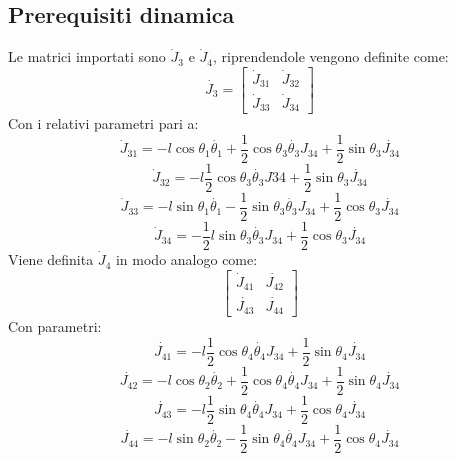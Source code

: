 \subsection{Prerequisiti dinamica}\label{appendice:t34punto}
Le matrici importati sono $\dot{J}_3$ e $\dot{J}_4$, riprendendole vengono definite come:
\begin{equation}
\dot{J_3} =
\begin{bmatrix}
 	\dot{J}_{31} & \dot{J}_{32} \\ 
 	\dot{J}_{33} & \dot{J}_{34}
 \end{bmatrix}
\end{equation}
Con i relativi parametri pari a:
\begin{equation*}
\dot{J}_{31} = -l\cos\theta_1\dot{\theta_1}+\frac{1}{2}\cos\theta_3\dot{\theta_3}J_{34}+\frac{1}{2}\sin\theta_3\dot{J_{34}}
\end{equation*}
\begin{equation*}
\dot{J}_{32} =   -l\frac{1}{2}\cos\theta_3\dot{\theta_3}J34+\frac{1}{2}\sin\theta_3\dot{J_{34}} 
\end{equation*}
\begin{equation*}
\dot{J}_{33} =  -l\sin\theta_1\dot{\theta_1}-\frac{1}{2}\sin\theta_3\dot{\theta_3}J_{34}+\frac{1}{2}\cos\theta_3\dot{J_{34}}
\end{equation*}
\begin{equation*}
\dot{J}_{34} = -\frac{1}{2}l\sin\theta_3\dot{\theta_3}J_{34}+\frac{1}{2}\cos\theta_3\dot{J_{34}}
\end{equation*}
Viene definita $\dot{J}_4$ in modo analogo come:
\begin{equation}
\begin{bmatrix}
\dot{J}_{41}  & \dot{J_{42}} \\ \dot{J_{43}} & \dot{J_{44}}
\end{bmatrix}
\end{equation}
Con parametri:
\begin{equation*}
\dot{J_{41}}= -l﻿\frac{1}{2}\cos\theta_4\dot{\theta_4}J_{34}+﻿\frac{1}{2}\sin\theta_4\dot{J_{34}}
\end{equation*}
\begin{equation*}
\dot{J_{42}}= -l\cos\theta_2\dot{\theta_2}+﻿\frac{1}{2}\cos\theta_4\dot{\theta_4}J_{34}+﻿\frac{1}{2}\sin\theta_4\dot{J_{34}}
\end{equation*}
\begin{equation*}
\dot{J_{43}}=  -l\frac{1}{2}\sin\theta_4\dot{\theta_4}J_{34}+﻿\frac{1}{2}\cos\theta_4\dot{J_{34}}          
\end{equation*}
\begin{equation*}
\dot{J_{44}}= -l\sin\theta_2\dot{\theta_2}-﻿\frac{1}{2}\sin\theta_4\dot{\theta_4}J_{34}+﻿\frac{1}{2}\cos\theta_4\dot{J_{34}}
\end{equation*}
